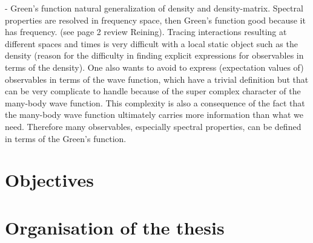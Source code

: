 - Green's function natural generalization of density and density-matrix. Spectral properties are resolved in frequency space, then Green's function good because it has frequency. (see page 2 review Reining). Tracing interactions resulting at different spaces and times is very difficult with a local static object such as the density (reason for the difficulty in finding explicit expressions for observables in terms of the density). One also wants to avoid to express (expectation values of) observables in terms of the wave function, which have a trivial definition but that can be very complicate to handle because of the super complex character of the many-body wave function. This complexity is also a consequence of the fact that the many-body wave function ultimately carries more information than what we need. Therefore many observables, especially spectral properties, can be defined in terms of the Green's function.

\section{Objectives\label{sec:objectives}}

\section{Organisation of the thesis\label{sec:organization-thesis}}

